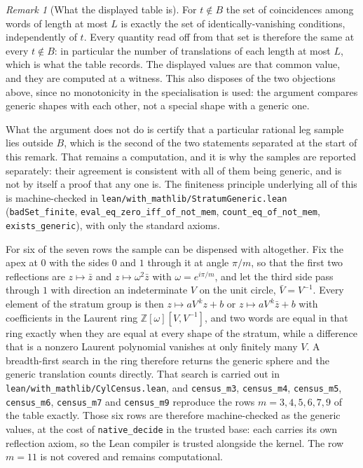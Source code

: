 \documentclass[11pt]{article}
\theoremstyle{definition}
\theoremstyle{remark}
\newtheorem{remark}[theorem]{Remark}
\newcommand{\Z}{\mathbb{Z}}
\begin{document}
\begin{remark}[What the displayed table is]
For $t\notin B$ the set of coincidences among words of length at most $L$ is exactly the set of
identically-vanishing conditions, independently of $t$. Every quantity read off from that set is
therefore the same at every $t\notin B$: in particular the number of translations of each length
at most $L$, which is what the table records. The displayed values are that common value, and
they are computed at a witness. This also disposes of the two objections above, since no
monotonicity in the specialisation is used: the argument compares generic shapes with each
other, not a special shape with a generic one.

What the argument does not do is certify that a particular rational leg sample lies outside $B$,
which is the second of the two statements separated at the start of this remark.
That remains a computation, and it is why the samples are reported separately: their
agreement is consistent with all of them being generic, and is not by itself a proof that any
one is. The finiteness principle underlying all of this is machine-checked in
\texttt{lean/with\_mathlib/StratumGeneric.lean} (\texttt{badSet\_finite},
\texttt{eval\_eq\_zero\_iff\_of\_not\_mem}, \texttt{count\_eq\_of\_not\_mem},
\texttt{exists\_generic}), with only the standard axioms.

For six of the seven rows the sample can be dispensed with altogether. Fix the
apex at $0$ with the sides $0$ and $1$ through it at angle $\pi/m$, so that the
first two reflections are $z\mapsto\bar z$ and $z\mapsto\omega^2\bar z$ with
$\omega=e^{i\pi/m}$, and let the third side pass through $1$ with direction an
indeterminate $V$ on the unit circle, $\bar V=V^{-1}$. Every element of the
stratum group is then $z\mapsto aV^{\,k}z+b$ or $z\mapsto aV^{\,k}\bar z+b$ with
coefficients in the Laurent ring $\Z[\omega][V,V^{-1}]$, and two words are equal
in that ring exactly when they are equal at every shape of the stratum, while a
difference that is a nonzero Laurent polynomial vanishes at only finitely many
$V$. A breadth-first search in the ring therefore returns the generic sphere and
the generic translation counts directly. That search is carried out in
\texttt{lean/with\_mathlib/CylCensus.lean}, and \texttt{census\_m3},
\texttt{census\_m4}, \texttt{census\_m5}, \texttt{census\_m6},
\texttt{census\_m7} and \texttt{census\_m9} reproduce the rows $m=3,4,5,6,7,9$
of the table exactly. Those six rows are therefore machine-checked as the
generic values, at the cost of \texttt{native\_decide} in the trusted base: each
carries its own reflection axiom, so the Lean compiler is trusted alongside the
kernel. The row $m=11$ is not covered and remains computational.
\end{remark}
\end{document}
